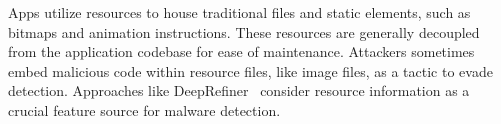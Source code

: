 


Apps utilize resources to house traditional files and static elements, such as bitmaps and animation instructions.
These resources are generally decoupled from the application codebase for ease of maintenance.
Attackers sometimes embed malicious code within resource files, like image files, as a tactic to evade detection.
Approaches like DeepRefiner~\cite{xu2018deeprefiner} consider resource information as a crucial feature source for malware detection.


